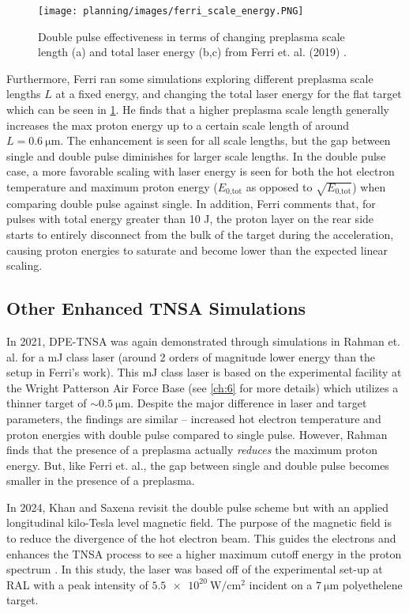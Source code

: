 \begin{figure}
	\centering 
	\texttt{[image: planning/images/ferri\_scale\_energy.PNG]}
	\caption{Double pulse effectiveness in terms of changing preplasma scale length (a) and total laser energy (b,c) from Ferri et. al. (2019) \cite{Ferri_2019_Nat_Comm}.}
	\label{fig:ferri_scale_energy}
\end{figure}

Furthermore, Ferri ran some simulations exploring different preplasma scale lengths $L$ at a fixed energy, and changing the total laser energy for the flat target \cite{Ferri_2019_Nat_Comm} which can be seen in \cref{fig:ferri_scale_energy}. He finds that a higher preplasma scale length generally increases the max proton energy up to a certain scale length of around $L = \SI{0.6}{\micro \meter}$. The enhancement is seen for all scale lengths, but the gap between single and double pulse diminishes for larger scale lengths. In the double pulse case, a more favorable scaling with laser energy is seen for both the hot electron temperature and maximum proton energy ($E_\text{0,tot}$ as opposed to $\sqrt{E_\text{0,tot}}$) when comparing double pulse against single. In addition, Ferri comments that, for pulses with total energy greater than 10 J, the proton layer on the rear side starts to entirely disconnect from the bulk of the target during the acceleration, causing proton energies to saturate and become lower than the expected linear scaling.

\subsection{Other Enhanced TNSA Simulations}
In 2021, \gls{DPE-TNSA} was again demonstrated through simulations in Rahman et. al. \cite{Rahman_2021_PoP} for a mJ class laser (around 2 orders of magnitude lower energy than the setup in Ferri's work). This mJ class laser is based on the experimental facility at the Wright Patterson Air Force Base (see \cref{ch:6} for more details) which utilizes a thinner target of $\sim \SI{0.5}{\micro \meter}$. Despite the major difference in laser and target parameters, the findings are similar -- increased hot electron temperature and proton energies with double pulse compared to single pulse. However, Rahman finds that the presence of a preplasma actually \emph{reduces} the maximum proton energy. But, like Ferri et. al., the gap between single and double pulse becomes smaller in the presence of a preplasma.

In 2024, Khan and Saxena \cite{Khan_2024_NJoP} revisit the double pulse scheme but with an applied longitudinal kilo-Tesla level magnetic field. The purpose of the magnetic field is to reduce the divergence of the hot electron beam. This guides the electrons and enhances the \gls{TNSA} process to see a higher maximum cutoff energy in the proton spectrum \cite{Arefiev_2016_NJoP}. In this study, the laser was based off of the experimental set-up at \gls{RAL} with a peak intensity of $\SI{5.5e20}{\watt \per \centi \meter \squared}$ incident on a $\SI{7}{\micro \meter}$ polyethelene target. 

